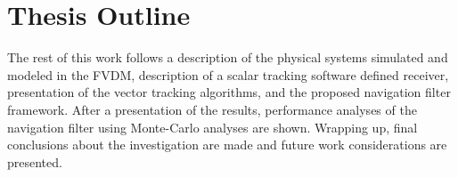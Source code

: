 \section{\textbf{Thesis Outline}}
The rest of this work follows a description of the physical systems simulated and modeled in the FVDM, description of a scalar tracking software defined receiver, presentation of the vector tracking algorithms, and the proposed navigation filter framework. After a presentation of the results, performance analyses of the navigation filter using Monte-Carlo analyses are shown. Wrapping up, final conclusions about the investigation are made and future work considerations are presented.